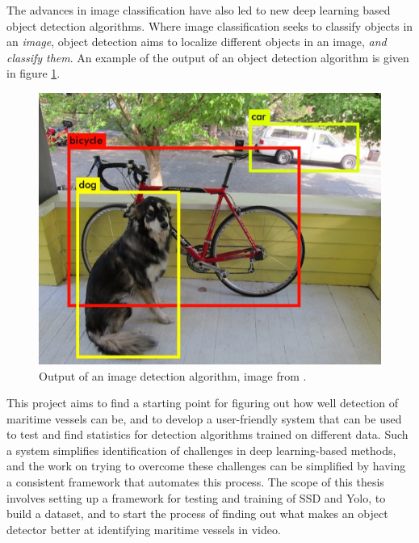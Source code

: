 \vspace{3mm}

\noindent
The advances in image classification have also led to new deep learning based object detection algorithms. Where image classification seeks to classify objects in an \textit{image}, object detection aims to localize different objects in an image, \textit{and classify them}. An example of the output of an object detection algorithm is given in figure \ref{fig:imdet}. 

\begin{figure}[h!]
\centering
\includegraphics[scale=0.3]{images/imdet.png}
\caption{Output of an image detection algorithm, image from \citep{YOLOv1}.}
\label{fig:imdet}
\end{figure}


\noindent
This project aims to find a starting point for figuring out how well detection of maritime vessels can be, and to develop a user-friendly system that can be used to test and find statistics for detection algorithms trained on different data. Such a system simplifies identification of challenges in deep learning-based methods, and the work on trying to overcome these challenges can be simplified by having a consistent framework that automates this process. The scope of this thesis involves setting up a framework for testing and training of SSD and Yolo, to build a dataset, and to start the process of finding out what makes an object detector better at identifying maritime vessels in video.


\cleardoublepage